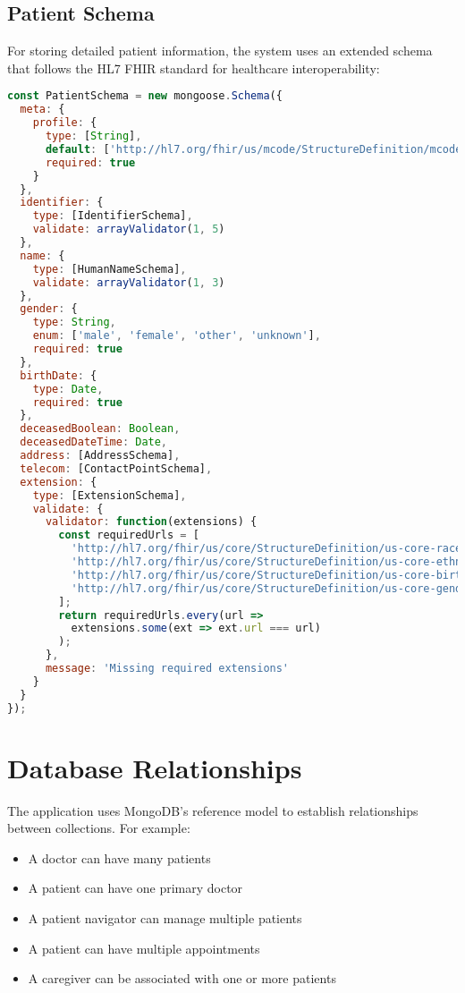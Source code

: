 \documentclass[12pt,a4paper]{report}
\begin{document}
\subsection{Patient Schema}
For storing detailed patient information, the system uses an extended schema that follows the HL7 FHIR standard for healthcare interoperability:

\begin{lstlisting}[language=JavaScript]
const PatientSchema = new mongoose.Schema({
  meta: {
    profile: {
      type: [String],
      default: ['http://hl7.org/fhir/us/mcode/StructureDefinition/mcode-cancer-patient'],
      required: true
    }
  },
  identifier: {
    type: [IdentifierSchema],
    validate: arrayValidator(1, 5)
  },
  name: {
    type: [HumanNameSchema],
    validate: arrayValidator(1, 3)
  },
  gender: {
    type: String,
    enum: ['male', 'female', 'other', 'unknown'],
    required: true
  },
  birthDate: {
    type: Date,
    required: true
  },
  deceasedBoolean: Boolean,
  deceasedDateTime: Date,
  address: [AddressSchema],
  telecom: [ContactPointSchema],
  extension: {
    type: [ExtensionSchema],
    validate: {
      validator: function(extensions) {
        const requiredUrls = [
          'http://hl7.org/fhir/us/core/StructureDefinition/us-core-race',
          'http://hl7.org/fhir/us/core/StructureDefinition/us-core-ethnicity',
          'http://hl7.org/fhir/us/core/StructureDefinition/us-core-birthsex',
          'http://hl7.org/fhir/us/core/StructureDefinition/us-core-genderIdentity'
        ];
        return requiredUrls.every(url => 
          extensions.some(ext => ext.url === url)
        );
      },
      message: 'Missing required extensions'
    }
  }
});
\end{lstlisting}

\section{Database Relationships}
The application uses MongoDB's reference model to establish relationships between collections. For example:

\begin{itemize}
    \item A doctor can have many patients
    \item A patient can have one primary doctor
    \item A patient navigator can manage multiple patients
    \item A patient can have multiple appointments
    \item A caregiver can be associated with one or more patients
\end{itemize}
\end{document}
